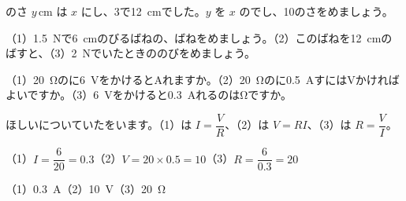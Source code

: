 \begingroup{}%
\noindent\begin{minipage}[t]{0.49\linewidth}
\begin{jibun}
のさ $y$\,cm は $x$ にし、3で\qty{12}{cm}でした。$y$ を $x$ のでし、10のさをめましょう。
\end{jibun}
\end{minipage}\hfill
\begin{minipage}[t]{0.49\linewidth}
\begin{jibun}
（1）\qty{1.5}{N}で\qty{6}{cm}のびるばねの、ばねをめましょう。（2）このばねを\qty{12}{cm}のばすと、（3）\qty{2}{N}でいたときののびをめましょう。
\end{jibun}
\end{minipage}\par
\endgroup

\begin{reidai}[オームの\R{法則}{ほう|そく}]
（1）\qty{20}{\ohm}のに\qty{6}{V}をかけるとAれますか。（2）\qty{20}{\ohm}のに\qty{0.5}{A}すにはVかければよいですか。（3）\qty{6}{V}をかけると\qty{0.3}{A}れるのはΩですか。\par
\kangaekata ほしいについていたをいます。（1）は $I=\dfrac{V}{R}$、（2）は $V=RI$、（3）は $R=\dfrac{V}{I}$。\par
\shiki（1）\nobreak$I=\dfrac{6}{20}=0.3$\quad（2）\nobreak$V=20\times0.5=10$\quad（3）\nobreak$R=\dfrac{6}{0.3}=20$\par
\kotae（1）\nobreak\qty{0.3}{A}\quad（2）\nobreak\qty{10}{V}\quad（3）\nobreak\qty{20}{\ohm}
\end{reidai}

